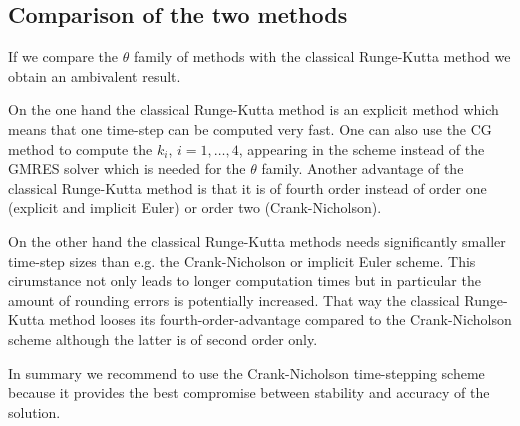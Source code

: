 \documentclass[a4paper, 11pt, twoside]{article}
\begin{document}
\subsection{Comparison of the two methods}

If we compare the $\theta$ family of methods with the classical Runge-Kutta method we obtain an ambivalent result.

On the one hand the classical Runge-Kutta method is an explicit method which means that one time-step can be computed very fast. One can also use the CG method to compute the $k_{i}$, $i = 1, \ldots, 4$, appearing in the scheme instead of the GMRES solver which is needed for the $\theta$ family. Another advantage of the classical Runge-Kutta method is that it is of fourth order instead of order one (explicit and implicit Euler) or order two (Crank-Nicholson).

On the other hand the classical Runge-Kutta methods needs significantly smaller time-step sizes than e.g. the Crank-Nicholson or implicit Euler scheme. This cirumstance not only leads to longer computation times but in particular the amount of rounding errors is potentially increased. That way the classical Runge-Kutta method looses its fourth-order-advantage compared to the Crank-Nicholson scheme although the latter is of second order only.

In summary we recommend to use the Crank-Nicholson time-stepping scheme because it provides the best compromise between stability and accuracy of the solution.


\newpage
\appendix



\printindex
\end{document}
